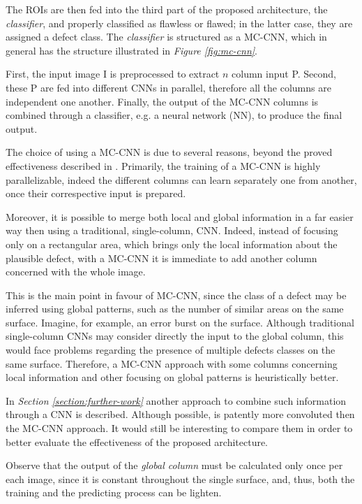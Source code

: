     \par{
        The ROIs are then fed into the third part of the proposed architecture, the \emph{classifier}, and properly classified as flawless or flawed; in the latter case, they are assigned a defect class. The \emph{classifier} is structured as a MC-CNN, which in general has the structure illustrated in \emph{Figure \ref{fig:mc-cnn}}. 
    }
    \par{
        First, the input image I is preprocessed to extract $n$ column input P. Second, these P are fed into different CNNs in parallel, therefore all the columns are independent one another. Finally, the output of the MC-CNN columns is combined through a classifier, e.g. a neural network (NN), to produce the final output.
    }
    \par{
        The choice of using a MC-CNN is due to several reasons, beyond the proved effectiveness described in \cite{ieee:6248110}. Primarily, the training of a MC-CNN is highly parallelizable, indeed the different columns can learn separately one from another, once their correspective input is prepared.
    }
    \par{
        Moreover, it is possible to merge both local and global information in a far easier way then using a traditional, single-column, CNN. Indeed, instead of focusing only on a rectangular area, which brings only the local information about the plausible defect, with a MC-CNN it is immediate to add another column concerned with the whole image.
    }
    \par{
        This is the main point in favour of MC-CNN, since the class of a defect may be inferred using global patterns, such as the number of similar areas on the same surface. Imagine, for example, an error burst on the surface. Although traditional single-column CNNs may consider directly the input to the global column, this would face problems regarding the presence of multiple defects classes on the same surface. Therefore, a MC-CNN approach with some columns concerning local information and other focusing on global patterns is heuristically better.
    }
    \par{
        In \emph{Section \ref{section:further-work}} another approach to combine such information through a CNN is described. Although possible, is patently more convoluted then the MC-CNN approach. It would still be interesting to compare them in order to better evaluate the effectiveness of the proposed architecture. 
    }
    \par{
        Observe that the output of the \emph{global column} must be calculated only once per each image, since it is constant throughout the single surface, and, thus, both the training and the predicting process can be lighten.
    }
